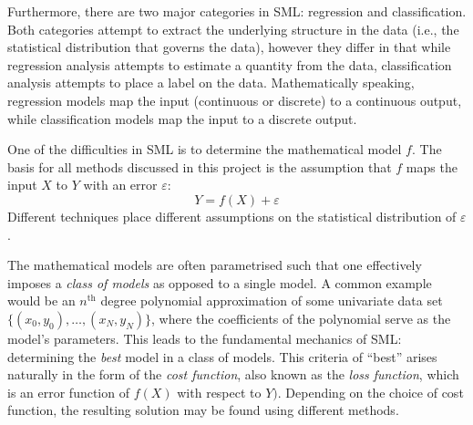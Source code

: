\documentclass[nofootinbib,reprint,english]{revtex4-1}
\begin{document}
Furthermore, there are two major categories in SML: regression and classification. Both categories attempt to extract the underlying structure in the data (i.e., the statistical distribution that governs the data), however they differ in that while regression analysis attempts to estimate a quantity from the data, classification analysis attempts to place a label on the data. Mathematically speaking, regression models map the input (continuous or discrete) to a continuous output, while classification models map the input to a discrete output.

One of the difficulties in SML is to determine the mathematical model \(f\). The basis for all methods discussed in this project is the assumption that \(f\) maps the input \(X\) to \(Y\) with an error \(\varepsilon\):
\begin{equation}\label{eq:fundamental_assumption}
Y=f(X)+\varepsilon
\end{equation}
Different techniques place different assumptions on the statistical distribution of \(\varepsilon\).

The mathematical models are often parametrised such that one effectively imposes a \emph{class of models} as opposed to a single model. A common example would be an \(n^\text{th}\) degree polynomial approximation of some univariate data set \(\{(x_0,y_0),\ldots,(x_N,y_N)\}\), where the coefficients of the polynomial serve as the model's parameters. This leads to the fundamental mechanics of SML: determining the \emph{best} model in a class of models. This criteria of ``best'' arises naturally in the form of the \emph{cost function}, also known as the \emph{loss function}, which is an error function of \(f(X)\) with respect to \(Y)\). Depending on the choice of cost function, the resulting solution may be found using different methods.
\end{document}
